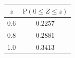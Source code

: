 {\setlength{\tabcolsep}{4pt}\renewcommand{\arraystretch}{1.3}\small%
\begin{tabular}{|c|c|}
\hline
$z$ & $\mathrm{P}(0\le Z\le z)$ \\
\hline
$0.6$ & $0.2257$ \\
\hline
$0.8$ & $0.2881$ \\
\hline
$1.0$ & $0.3413$ \\
\hline
\end{tabular}}
